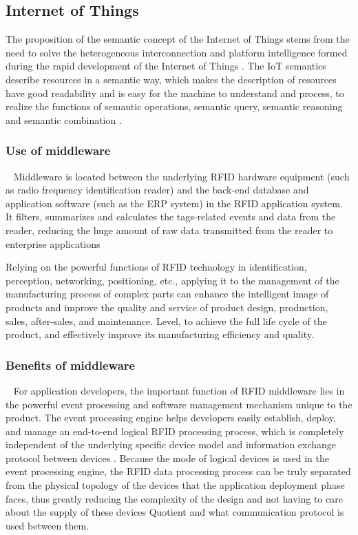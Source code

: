 \documentclass[conference]{IEEEtran}
\begin{document}
\subsection{Internet of Things}
The proposition of the semantic concept of the Internet of Things stems from the need to solve the heterogeneous interconnection and platform intelligence formed during the rapid development of the Internet of Things \cite{b4}. The IoT semantics describe resources in a semantic way, which makes the description of resources have good readability and is easy for the machine to understand and process, to realize the functions of semantic operations, semantic query, semantic reasoning and semantic combination \cite{b5}.

\subsubsection{Use of middleware}
\
\newline
\indent
Middleware is located between the underlying RFID hardware equipment (such as radio frequency identification reader) and the back-end database and application software (such as the ERP system) in the RFID application system. It filters, summarizes and calculates the tags-related events and data from the reader, reducing the huge amount of raw data transmitted from the reader to enterprise applications

Relying on the powerful functions of RFID technology in identification, perception, networking, positioning, etc., applying it to the management of the manufacturing process of complex parts can enhance the intelligent image of products and improve the quality and service of product design, production, sales, after-sales, and maintenance. Level, to achieve the full life cycle of the product, and effectively improve its manufacturing efficiency and quality.

\subsubsection{Benefits of middleware}
\
\newline
\indent
For application developers, the important function of RFID middleware lies in the powerful event processing and software management mechanism unique to the product. The event processing engine helps developers easily establish, deploy, and manage an end-to-end logical RFID processing process, which is completely independent of the underlying specific device model and information exchange protocol between devices \cite{b13}. Because the mode of logical devices is used in the event processing engine, the RFID data processing process can be truly separated from the physical topology of the devices that the application deployment phase faces, thus greatly reducing the complexity of the design and not having to care about the supply of these devices Quotient and what communication protocol is used between them.
\end{document}

